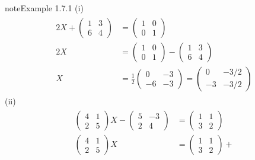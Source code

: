 \documentclass[letterpaper,10pt,english]{jupyterBook}
\begin{document}
\begin{sphinxadmonition}{note}{Example 1.7.1}
\sphinxAtStartPar
(i)
\begin{equation*}
\begin{split} \begin{align*}
    2X +
    \begin{pmatrix} 1 & 3 \\ 6 & 4 \end{pmatrix}
    &=
    \begin{pmatrix} 1 & 0 \\ 0 & 1 \end{pmatrix} \\
    2X &=
    \begin{pmatrix} 1 & 0 \\ 0 & 1 \end{pmatrix} -
    \begin{pmatrix} 1 & 3 \\ 6 & 4 \end{pmatrix} \\
    X &= \frac{1}{2}
    \begin{pmatrix} 0 & -3 \\ -6 & -3 \end{pmatrix} =
    \begin{pmatrix} 0 & -3/2 \\ -3 & -3/2 \end{pmatrix}
\end{align*} \end{split}
\end{equation*}
\sphinxAtStartPar
(ii)
\begin{equation*}
\begin{split} \begin{align*}
    \begin{pmatrix} 4 & 1 \\ 2 & 5 \end{pmatrix} X -
    \begin{pmatrix} 5 & -3 \\ 2 & 4 \end{pmatrix}
    &=
    \begin{pmatrix} 1 & 1 \\ 3 & 2 \end{pmatrix} \\
    \begin{pmatrix} 4 & 1 \\ 2 & 5 \end{pmatrix} X
    &=
    \begin{pmatrix} 1 & 1 \\ 3 & 2 \end{pmatrix} +

\end{align*}
\end{split}
\end{equation*}
\end{sphinxadmonition}
\end{document}
